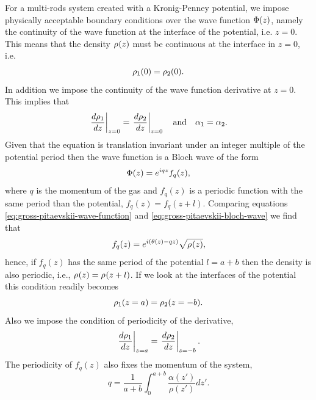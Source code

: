 For a multi-rods system created with a Kronig-Penney potential, we impose
physically acceptable boundary conditions over the wave function
${\Phi}(z)$, namely the continuity of the wave function at the interface of
the potential, i.e. $z = 0$. This means that the density ${\rho_{}}(z)$ must be
continuous at the interface in $z=0$, i.e.
%
\begin{equation}
  \label{eq:gross-pitaevskii-density-continuity}
  \gprho[1](0) = \gprho[2](0).
\end{equation}
%
In addition we impose the continuity of the wave function derivative at $z = 0$.
This implies that
%
\begin{align}
  \label{eq:gross-pitaevskii-density-derivative-continuity}
  \left. \frac{d\gprho[1]}{dz}\right|_{z=0} = \left. \frac{d\gprho[2]}{dz}\right|_{z=0} \quad \mathrm{and} \quad \alpha_1 = \alpha_2.
\end{align}
%
Given that the {\GP} equation is translation invariant under an integer multiple
of the potential period then the wave function is a Bloch wave of the form
%
\begin{equation}
  \label{eq:gross-pitaevskii-bloch-wave}
  \gpwavefunc(z) = e^{i q z} f_q(z),
\end{equation}
%
where $q$ is the momentum of the gas and $f_q(z)$ is a periodic function with
the same period than the potential, $f_q(z) = f_q(z + l)$. Comparing equations
\eqref{eq:gross-pitaevskii-wave-function} and
\eqref{eq:gross-pitaevskii-bloch-wave} we find that
%
\begin{equation}
  f_q(z) = e^{i (\theta(z) - q z)} \sqrt{{\rho_{}}(z)},
\end{equation}
%
hence, if $f_q(z)$ has the same period of the potential $l = a + b$ then the
density is also periodic, i.e., ${\rho_{}}(z) = {\rho_{}}(z + l)$. If we look at the
interfaces of the potential this condition readily becomes
%
\begin{equation}
  \label{eq:gross-pitaevskii-density-periodicity}
  \gprho[1](z = a) = \gprho[2](z = -b).
\end{equation}
%
Also we impose the condition of periodicity of the derivative,
%
\begin{equation}
  \label{eq:gross-pitaevskii-density-derivative-periodicity}
  \left. \frac{d\gprho[1]}{dz}\right|_{z=a} = \left. \frac{d\gprho[2]}{dz}\right|_{z=-b}.
\end{equation}
%
The periodicity of $f_q(z)$ also fixes the momentum of the system,
%
\begin{equation}
  \label{eq:gross-pitaevskii-system-momentum}
  q = \frac{1}{a + b} \int_{0}^{a+b} \frac{\alpha(z')}{\rho(z')} dz'.
\end{equation}
